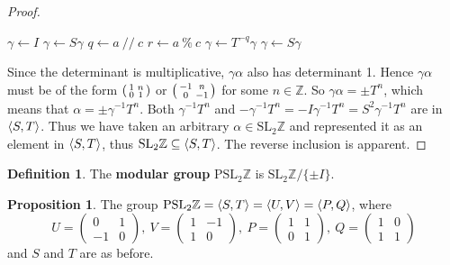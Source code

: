 \documentclass[12pt,twoside]{reedthesis}
\theoremstyle{definition}
\newtheorem{defn}[thm]{Definition}
\newtheorem{prop}[thm]{Proposition}
\newcommand{\Z}{\mathbb{Z}}
\newcommand{\SLZ}{\mathrm{SL}_2{\Z}}
\newcommand{\PSLZ}{\mathrm{PSL}_2{\Z}}
\newcommand{\defnphrase}[1]{\textbf{#1}}
\DeclarePairedDelimiter\ang{\langle}{\rangle}
\begin{document}
\begin{proof}
  \vspace{1em}
  \begin{algorithmic}
    \State $\gamma \gets I$
      $\gamma \gets S \gamma$
    \EndIf
      \State $q \gets a \ // \ c$
      \State $r \gets a\ \% \ c$
      \State $\gamma \gets T^{-q} \gamma$
        $\gamma \gets S \gamma$
      \EndIf
    \EndWhile
  \end{algorithmic}

  Since the determinant is multiplicative, $\gamma \alpha$ also has determinant 1.
  Hence $\gamma\alpha$ must be of the form $\begin{psmallmatrix}1 & n \\ 0 & 1\end{psmallmatrix}$ or $\begin{psmallmatrix}-1 & n \\ 0 & -1\end{psmallmatrix}$ for some $n \in \Z$.
  So $\gamma \alpha = \pm T^n$, which means that $\alpha = \pm \gamma^{-1} T^n$.
  Both $\gamma^{-1} T^n$ and $-\gamma^{-1} T^n = -I \gamma^{-1} T^n = S^2 \gamma^{-1} T^n$ are in $\ang{S,T}$.
  Thus we have taken an arbitrary $\alpha \in \SLZ$ and represented it as an element in $\ang{S,T}$, thus $\SLZ \subseteq \ang{S,T}$.
  The reverse inclusion is apparent.
\end{proof}

\begin{defn}
  The \defnphrase{modular group} $\PSLZ$ is $\SLZ / \{ \pm I \}$.
\end{defn}

\begin{prop}\label{prop:pslgenerators}
  The group $\PSLZ = \ang{S, T} = \ang{U,V} = \ang{P,Q}$, where
  \begin{equation*}
    U = \begin{pmatrix}
      0 & 1 \\
      -1 & 0
    \end{pmatrix},\
    V = \begin{pmatrix}
      1 & -1 \\
      1 & 0
    \end{pmatrix},\
    P = \begin{pmatrix}
      1 & 1 \\
      0 & 1
    \end{pmatrix},\
    Q = \begin{pmatrix}
      1 & 0 \\
      1 & 1
    \end{pmatrix}
  \end{equation*}
  and $S$ and $T$ are as before.
\end{prop}
\end{document}
